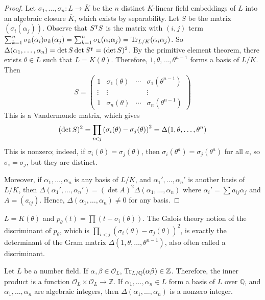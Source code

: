 \begin{proof}
    Let \( \sigma_1, \dots, \sigma_n \colon L \to \overline K \) be the \( n \) distinct \( K \)-linear field embeddings of \( L \) into an algebraic closure \( \overline K \), which exists by separability.
    Let \( S \) be the matrix \( (\sigma_i(\alpha_j)) \).
    Observe that \( S^\intercal S \) is the matrix with \( (i,j) \) term \( \sum_{k=1}^n \sigma_k(\alpha_i) \sigma_k(\alpha_j) = \sum_{k=1}^n \sigma_k(\alpha_i \alpha_j) = \Tr_{L/K}(\alpha_i \alpha_j) \).
    So \( \Delta(\alpha_1, \dots, \alpha_n) = \det S \det S^\intercal = (\det S)^2 \).
    By the primitive element theorem, there exists \( \theta \in L \) such that \( L = K(\theta) \).
    Therefore, \( 1, \theta, \dots, \theta^{n-1} \) forms a basis of \( L / K \).
    Then
    \[ S = \begin{pmatrix}
        1 & \sigma_1(\theta) & \cdots & \sigma_1(\theta^{n-1}) \\
        \vdots & \vdots & & \vdots \\
        1 & \sigma_n(\theta) & \cdots & \sigma_n(\theta^{n-1})
    \end{pmatrix} \]
    This is a Vandermonde matrix, which gives
    \[ (\det S)^2 = \prod_{i < j} \qty(\sigma_i(\theta) - \sigma_j(\theta))^2 = \Delta(1, \theta, \dots, \theta^n) \]
    This is nonzero; indeed, if \( \sigma_i(\theta) = \sigma_j(\theta) \), then \( \sigma_i(\theta^a) = \sigma_j(\theta^a) \) for all \( a \), so \( \sigma_i = \sigma_j \), but they are distinct.

    Moreover, if \( \alpha_1, \dots, \alpha_n \) is any basis of \( L / K \), and \( \alpha_1', \dots, \alpha_n' \) is another basis of \( L / K \), then \( \Delta(\alpha_1', \dots, \alpha_n') = (\det A)^2 \Delta(\alpha_1, \dots, \alpha_n) \) where \( \alpha_i' = \sum a_{ij} \alpha_j \) and \( A = (a_{ij}) \).
    Hence, \( \Delta(\alpha_1, \dots, \alpha_n) \neq 0 \) for any basis.
\end{proof}
\begin{remark}
    \( L = K(\theta) \) and \( p_\theta(t) = \prod (t-\sigma_i(\theta)) \).
    The Galois theory notion of the discriminant of \( p_\theta \), which is \( \prod_{i < j} (\sigma_i(\theta) - \sigma_j(\theta))^2 \), is exactly the determinant of the Gram matrix \( \Delta(1, \theta, \dots, \theta^{n-1}) \), also often called a discriminant.
\end{remark}
\begin{remark}
    Let \( L \) be a number field.
    If \( \alpha, \beta \in \mathcal O_L \), \( \Tr_{L/\mathbb Q}(\alpha\beta) \in \mathbb Z \).
    Therefore, the inner product is a function \( \mathcal O_L \times \mathcal O_L \to \mathbb Z \).
    If \( \alpha_1, \dots, \alpha_n \in L \) form a basis of \( L \) over \( \mathbb Q \), and \( \alpha_1, \dots, \alpha_n \) are algebraic integers, then \( \Delta(\alpha_1, \dots, \alpha_n) \) is a nonzero integer.
\end{remark}
